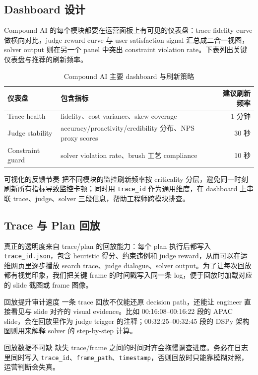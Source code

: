 \documentclass[a4paper]{article}
\begin{document}
\subsection{Dashboard 设计}
Compound AI 的每个模块都要在运营面板上有可见的仪表盘：trace fidelity curve 做横向对比，judge reward curve 与 user satisfaction signal 汇总成二合一视图，solver output 则在另一个 panel 中突出 constraint violation rate。下表列出关键仪表盘与推荐的刷新频率。
\begin{table}[H]
\centering
\begin{tabular}{lp{8cm}r}
\toprule
仪表盘 & 包含指标 & 建议刷新频率 \\
\midrule
Trace health & fidelity、cost variance、skew coverage & 1 分钟 \\
Judge stability & accuracy/proactivity/credibility 分布、NPS proxy scores & 30 秒 \\
Constraint guard & solver violation rate、brush 工艺 compliance & 10 秒 \\
\bottomrule
\end{tabular}
\caption{Compound AI 主要 dashboard 与刷新策略}
\end{table}
\begin{knowledgebox}{可视化的反馈节奏}
把不同模块的监控刷新频率按 criticality 分层，避免同一时刻刷新所有指标导致监控卡顿；同时用 \texttt{trace\_id} 作为通用维度，在 dashboard 上串联 trace、judge、solver 三段信息，帮助工程师跨模块排查。
\end{knowledgebox}

\subsection{Trace 与 Plan 回放}
真正的透明度来自 trace/plan 的回放能力：每个 plan 执行后都写入 \texttt{trace\_id.json}，包含 heuristic 得分、约束违例和 judge reward，从而可以在运维网页里逐步播放 search trace、judge dialogue、solver output。为了让每次回放都有视觉印象，我们把关键 frame 的时间戳写入同一条 log，便于回放时加载对应的 slide 截图或 frame 图像。
\begin{knowledgebox}{回放提升审计速度}
一条 trace 回放不仅能还原 decision path，还能让 engineer 直接看见与 slide 对齐的 visual evidence。比如 00:16:08--00:16:22 段的 APAC slide，会在回放里作为 judge trigger 的注释；00:32:25--00:32:45 段的 DSPy 架构图则用来解释 solver 的 step-by-step 计算。
\end{knowledgebox}
\begin{warningbox}{回放数据不可缺}
缺失 trace/frame 之间的时间对齐会拖慢调查进度。务必在日志里同时写入 \texttt{trace\_id}、\texttt{frame\_path}、\texttt{timestamp}，否则回放时只能靠模糊对照，运营判断会失真。
\end{warningbox}
\end{document}

